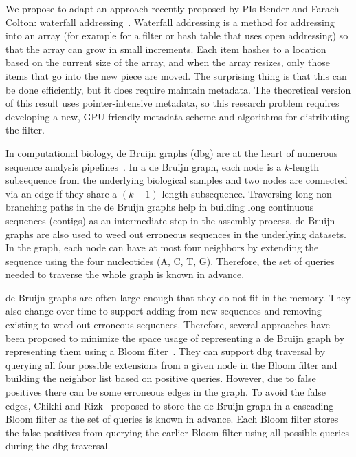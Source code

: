 We propose to adapt an approach recently proposed by PIs Bender and Farach-Colton: waterfall addressing~\cite{all-purpose-hashing}.   Waterfall addressing is a method for addressing into an array (for example for a filter or hash table that uses open addressing) so that the array can grow in small increments.  Each item hashes to a location based on the current size of the array, and when the array resizes, only those items that go into the new piece are moved.  The surprising thing is that this can be done efficiently, but it does require maintain metadata.  The theoretical version of this result uses pointer-intensive metadata, so this research problem requires developing a new, GPU-friendly metadata scheme and algorithms for distributing the filter.




  In computational biology, de Bruijn graphs (dbg) are at the heart of numerous sequence analysis pipelines~\cite{PandeyBJP17a, PandeyBJP17b}. In a de Bruijn graph, each node is a $k$-length subsequence from the underlying biological samples and two nodes are connected via an edge if they share a $(k-1)$-length subsequence.  Traversing long non-branching paths in the de Bruijn graphs help in building long continuous sequences (contigs) as an intermediate step in the assembly process. de Bruijn graphs are also used to weed out erroneous sequences in the underlying datasets. In the graph, each node can have at most four neighbors by extending the sequence using the four nucleotides (A, C, T, G). Therefore, the set of queries needed to traverse the whole graph is known in advance.

de Bruijn graphs are often large enough that they do not fit in the memory. They also change over time to support adding \kmers from new sequences and removing existing \kmers to weed out erroneous sequences.
Therefore, several approaches have been proposed to minimize the space usage of representing a de Bruijn graph by representing them using a Bloom filter~\cite{chikhi2013space}. They can support dbg traversal by querying all four possible extensions from a given node in the Bloom filter and building the neighbor list based on positive queries. However, due to false positives there can be some erroneous edges in the graph.
To avoid the false edges, Chikhi and Rizk~\cite{chikhi2013space} proposed to store the de Bruijn graph in a cascading Bloom filter as the set of queries is known in advance. Each Bloom filter stores the false positives from querying the earlier Bloom filter using all possible queries during the dbg traversal.

